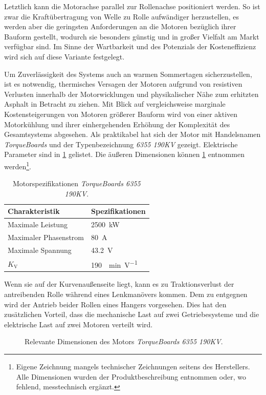 	Letztlich kann die Motorachse parallel zur Rollenachse positioniert werden.
	So ist zwar die Kraftübertragung von Welle zu Rolle aufwändiger herzustellen, es werden aber die geringsten Anforderungen an die Motoren bezüglich ihrer Bauform gestellt, wodurch sie besonders günstig und in großer Vielfalt am Markt verfügbar sind.
	Im Sinne der Wartbarkeit und des Potenzials der Kosteneffizienz wird sich auf diese Variante festgelegt.\par\medskip
	Um Zuverlässigkeit des Systems auch an warmen Sommertagen sicherzustellen, ist es notwendig, thermisches Versagen der Motoren aufgrund von resistiven Verlusten innerhalb der Motorwicklungen und physikalischer Nähe zum erhitzten Asphalt in Betracht zu ziehen.
	Mit Blick auf vergleichsweise marginale Kostensteigerungen von Motoren größerer Bauform wird von einer aktiven Motorkühlung und ihrer einhergehenden Erhöhung der Komplexität des Gesamtsystems abgesehen.
	Als praktikabel hat sich der Motor mit Handelsnamen \textit{TorqueBoards} und der Typenbezeichnung \textit{6355 190KV} gezeigt.
	Elektrische Parameter sind in \cref{tab:TB 6355 190KV electrical specs} gelistet.
	Die äußeren Dimensionen können \cref{fig:motor} entnommen werden\footnote{\hspace{1mm} Eigene Zeichnung mangels technischer Zeichnungen seitens des Herstellers.
	Alle Dimensionen wurden der Produktbeschreibung entnommen oder, wo fehlend, messtechnisch ergänzt.}.
	\begin{table}[h]
		\centering
		\caption[Motorspezifikationen \textit{TorqueBoards 6355 190KV}]{Motorspezifikationen \textit{TorqueBoards 6355 190KV}.}%
		\label{tab:TB 6355 190KV electrical specs}
		\begin{tabular}{p{}l}
			\toprule
			Charakteristik					& Spezifikationen\\ \midrule
			Maximale Leistung				& \qty{2500}{\kilo\watt}\\
			Maximaler Phasenstrom			& \qty{80}{\ampere}\\
			Maximale Spannung				& \qty{43,2}{\volt}\\
			\(K_\text{V}\)					& \qty{190}{\per\minute\per\volt}\\ \bottomrule
		\end{tabular}
	\end{table}
	
	Wenn sie auf der Kurvenaußenseite liegt, kann es zu Traktionsverlust der antreibenden Rolle während eines Lenkmanövers kommen.
	Dem zu entgegnen wird der Antrieb beider Rollen eines Hangers vorgesehen.
	Dies hat den zusätzlichen Vorteil, dass die mechanische Last auf zwei Getriebesysteme und die elektrische Last auf zwei Motoren verteilt wird.
	\begin{figure}[h]
		\centering
		
		\caption{Relevante Dimensionen des Motors \textit{TorqueBoards 6355 190KV}.}%
		\label{fig:motor}
	\end{figure}
